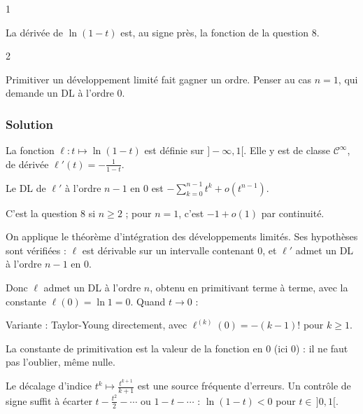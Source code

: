 \documentclass[11pt,a4paper]{article}
\newcommand{\equationajustee}[1]{%
  \sbox{\boiteequation}{$\displaystyle #1$}%
  \ifdim\wd\boiteequation>\linewidth
    \[\resizebox{\linewidth}{!}{\usebox{\boiteequation}}\]%
  \else
    \[#1\]%
  \fi}
\begin{document}
\begin{indication}{1}

La dérivée de \(\ln(1-t)\) est, au signe près, la fonction de la question 8.

\end{indication}

\begin{indication}{2}

Primitiver un développement limité fait gagner un ordre. Penser au cas \(n=1\), qui demande un DL à l'ordre \(0\).

\end{indication}

\hypertarget{solution-8}{%
\subsubsection{Solution}\label{solution-8}}

La fonction \(\ell:t\mapsto\ln(1-t)\) est définie sur \(\boxed{]-\infty,1[}\). Elle y est de classe \(\mathcal C^\infty\), de dérivée \(\ell'(t)=-\frac1{1-t}\).

Le DL de \(\ell'\) à l'ordre \(n-1\) en \(0\) est \(-\sum_{k=0}^{n-1}t^k+o(t^{n-1})\).

C'est la question 8 si \(n\ge2\) ; pour \(n=1\), c'est \(-1+o(1)\) par continuité.

On applique le théorème d'intégration des développements limités. Ses hypothèses sont vérifiées : \(\ell\) est dérivable sur un intervalle contenant \(0\), et \(\ell'\) admet un DL à l'ordre \(n-1\) en \(0\).

Donc \(\ell\) admet un DL à l'ordre \(n\), obtenu en primitivant terme à terme, avec la constante \(\ell(0)=\ln1=0\). Quand \(t\to0\) :

\equationajustee{\boxed{\ln(1-t)=-\sum_{k=1}^n\frac{t^k}{k}+o(t^n)}}

Variante : Taylor-Young directement, avec \(\ell^{(k)}(0)=-(k-1)!\) pour \(k\ge1\).

\begin{piege}

La constante de primitivation est la valeur de la fonction en \(0\) (ici \(0\)) : il ne faut pas l'oublier, même nulle.

Le décalage d'indice \(t^k\mapsto\frac{t^{k+1}}{k+1}\) est une source fréquente d'erreurs. Un contrôle de signe suffit à écarter \(t-\frac{t^2}2-\cdots\) ou \(1-t-\cdots\) : \(\ln(1-t)<0\) pour \(t\in\,]0,1[\).

\end{piege}
\end{document}
